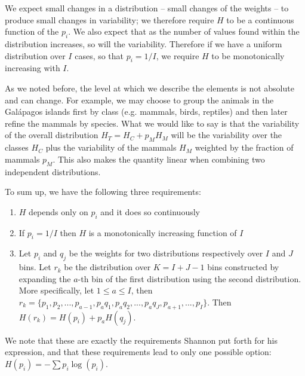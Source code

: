 \documentclass{article}
\begin{document}
We  expect small changes in a distribution -- small changes of the weights -- to produce small changes in variability; we therefore require $H$ to be a continuous function of the $p_i$. We also expect that as the number of values found within the distribution increases, so will the variability. Therefore if we have a uniform distribution over $I$ cases, so that $p_i = 1/I$, we require $H$ to be monotonically increasing with $I$.

As we noted before, the level at which we describe the elements is not absolute and can change. For example, we may choose to group the animals in the Gal\'{a}pagos islands first by class (e.g. mammals, birds, reptiles) and then later refine the mammals by species. What we would like to say is that the variability of the overall distribution $H_T = H_C + p_M H_M$ will be the variability over the classes $H_C$ plus the variability of the mammals $H_M$ weighted by the fraction of mammals $p_M$. This also makes the quantity linear when combining two independent distributions.

To sum up, we have the following three requirements:
\begin{enumerate}
\item $H$ depends only on $p_i$ and it does so continuously
\item If $p_i=1/I$ then $H$ is a monotonically increasing function of $I$
\item Let $p_i$ and $q_j$ be the weights for two distributions respectively over $I$ and $J$ bins. Let $r_k$ be the distribution over $K=I+J-1$ bins constructed by expanding the $a$-th bin of the first distribution using the second distribution. More specifically, let $1 \leq a \leq I$, then $r_k = \{p_1, p_2, ..., p_{a-1}, p_{a}q_1, p_{a}q_2, ..., p_{a}q_J, p_{a+1}, ..., p_I \}$. Then $H(r_k) = H(p_i) + p_{a} H(q_j)$.
\end{enumerate}

We note that these are exactly the requirements Shannon put forth for his expression\cite{Shannon}, and that these requirements lead to only one possible option: $H(p_i) = - \sum p_i \log(p_i)$.
\end{document}
